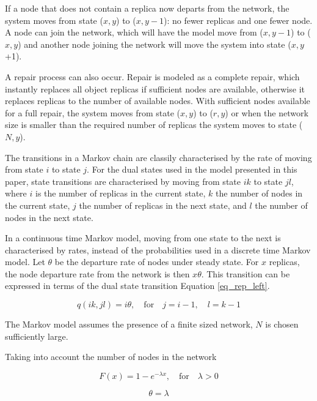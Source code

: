 \documentclass[10pt,a4paper,conference]{IEEEtran}
\begin{document}
If a node that does not contain a replica now departs from the network, the system moves from state ($x,y$) to ($x,y-1$): no fewer replicas and one fewer node. A node can join the network, which will have the model move from ($x,y-1$) to ($x,y$) and another node joining the network will move the system into state ($x,y$+1).

A repair process can also occur. Repair is modeled as a complete repair, which instantly replaces all object replicas if sufficient nodes are available, otherwise it replaces replicas to the number of available nodes. With sufficient nodes available for a full repair, the system moves from state ($x,y$) to ($r,y$) or when the network size is smaller than the required number of replicas the system moves to state ($N,y$).

The transitions in a Markov chain are classily characterised by the rate of moving from state $i$ to state $j$. For the dual states used in the model presented in this paper, state transitions are characterised by moving from state $i k$ to state $j l$, where $i$ is the number of replicas in the current state, $k$ the number of nodes in the current state, $j$ the number of replicas in the next state, and $l$ the number of nodes in the next state.

In a continuous time Markov model, moving from one state to the next is characterised by rates, instead of the probabilities used in a discrete time Markov model. Let $\theta$ be the departure rate of nodes under steady state. For $x$ replicas, the node departure rate from the network is then $x\theta$. This transition can be expressed in terms of the dual state transition Equation \ref{eq_rep_left}.

\begin{equation} \label{eq_rep_left}
    q(i k,j l) = i\theta,\quad\textrm{for}\quad j = i - 1,\quad l = k - 1
\end{equation}

The Markov model assumes the presence of a finite sized network, $N$ is chosen sufficiently large.

Taking into account the number of nodes in the network

\begin{equation}
    F(x) = 1 - e^{-\lambda x},\quad\textrm{for}\quad \lambda > 0
\end{equation}

\begin{equation}
    \theta = \lambda
\end{equation}
\end{document}
